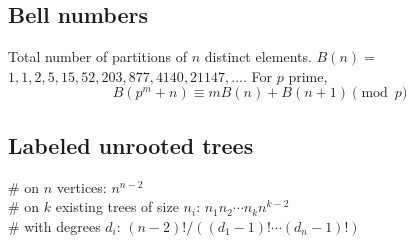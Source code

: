   \subsection{Bell numbers}
    Total number of partitions of $n$ distinct elements. $B(n) =$
    $1, 1, 2, 5, 15, 52, 203, 877, 4140, 21147, \dots$. For $p$ prime,
    \[ B(p^m+n)\equiv mB(n)+B(n+1) \pmod{p} \]

  \subsection{Labeled unrooted trees}
    \# on $n$ vertices: $n^{n-2}$ \\
    \# on $k$ existing trees of size $n_i$: $n_1n_2\cdots n_k n^{k-2}$ \\
    \# with degrees $d_i$: $(n-2)! / ((d_1-1)! \cdots (d_n-1)!)$
